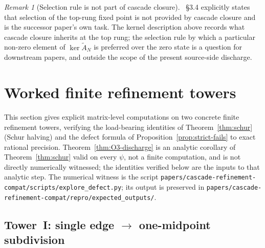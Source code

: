 \documentclass[11pt]{article}
\theoremstyle{plain}
\theoremstyle{definition}
\theoremstyle{remark}
\newtheorem{remark}[theorem]{Remark}
\begin{document}
\begin{remark}[Selection rule is not part of cascade closure]
\cite{CascadeMechanism}~\S3.4 explicitly states that selection of
the top-rung fixed point is not provided by cascade closure and is
the successor paper's own task. The kernel description above
records what cascade closure inherits at the top rung; the
selection rule by which a particular non-zero element of
$\ker \widetilde A_N$ is preferred over the zero state is a
question for downstream papers, and outside the scope of the
present source-side discharge.
\end{remark}

\section{Worked finite refinement towers}\label{sec:worked}

This section gives explicit matrix-level computations on two
concrete finite refinement towers, verifying the load-bearing
identities of Theorem~\ref{thm:schur} (Schur halving) and the
defect formula of Proposition~\ref{prop:strict-fails} to exact
rational precision. Theorem~\ref{thm:O3-discharge} is an analytic
corollary of Theorem~\ref{thm:schur} valid on every $\psi$, not a
finite computation, and is not directly numerically witnessed; the
identities verified below are the inputs to that analytic step.
The numerical witness is the script
\texttt{papers/cascade-refinement-compat/scripts/explore\_defect.py};
its output is preserved in
\texttt{papers/cascade-refinement-compat/repro/expected\_outputs/}.

\subsection{Tower~I: single edge $\to$ one-midpoint subdivision}
\end{document}
